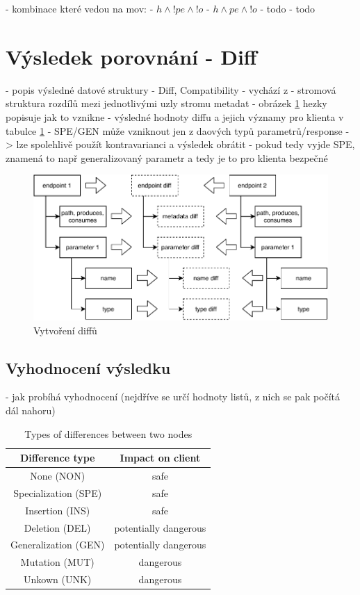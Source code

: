 \documentclass[czech,DP]{thesiskiv}
\begin{document}
- kombinace které vedou na mov: 
	- $h \land !pe \land !o$
	- $h \land pe \land !o$
	- todo
	- todo
	
	
\section{Výsledek porovnání - Diff}	
- popis výsledné datové struktury
	- Diff, Compatibility
	- vychází z \cite{brada2006diff}
	- stromová struktura rozdílů mezi jednotlivými uzly stromu metadat
	- obrázek \ref{fig:diff-construction} hezky popisuje jak to vznikne
	- výsledné hodnoty diffu a jejich významy pro klienta v tabulce \ref{tab:diff-level}
		- SPE/GEN může vzniknout jen z daových typů parametrů/response -> lze spolehlivě použít kontravarianci a výsledek obrátit
		- pokud tedy vyjde SPE, znamená to např generalizovaný parametr a tedy je to pro klienta bezpečné
	
\begin{figure}[h]
	\centering
	\includegraphics{diff-construction}
	\caption{Vytvoření diffů}
	\label{fig:diff-construction}
\end{figure}

\subsection{Vyhodnocení výsledku}

- jak probíhá vyhodnocení (nejdříve se určí hodnoty listů, z nich se pak počítá dál nahoru)

\begin{table}[h!]
	\centering
	\begin{tabular}{c|c}
		Difference type & Impact on client  \\
		\hline
		None (NON) & safe \\
		Specialization (SPE) & safe  \\
		Insertion (INS) & safe \\
		Deletion (DEL) & potentially dangerous \\
		Generalization (GEN) & potentially dangerous \\
		Mutation (MUT) & dangerous \\
		Unkown (UNK) & dangerous
	\end{tabular}
	\caption{Types of differences between two nodes }
	\label{tab:diff-level}
\end{table}
\end{document}
